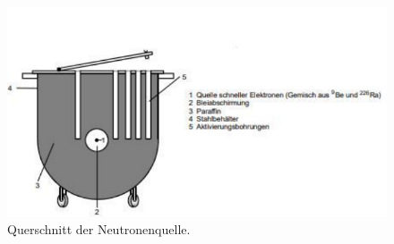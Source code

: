 \begin{figure}
    \centering
    \includegraphics[width =\textwidth]{content/QuerschnittQuelle.pdf}
    \caption{Querschnitt der Neutronenquelle.\cite{anleitung}}
    \label{fig:QuelleQuerschnitt}
\end{figure}

